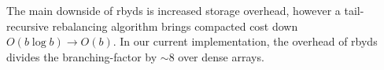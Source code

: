 \documentclass[letterpaper,twocolumn,10pt]{article}
\begin{document}

The main downside of rbyds is increased storage overhead, however a
tail-recursive rebalancing algorithm brings compacted cost down
$O(b \log b) \rightarrow O(b)$.
In our current implementation, the overhead of rbyds divides the
branching-factor by {$\sim$}8 over dense arrays.



%
%
%
%

% 
% 
% 
% 
% 
% 
% 
% 
% 
% 
\end{document}
